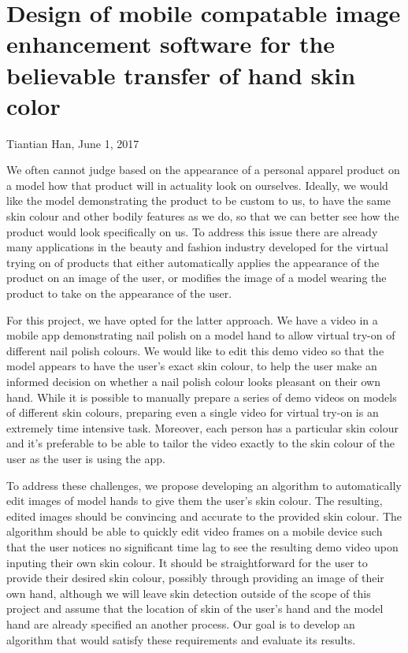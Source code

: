 \documentclass[12pt, a4paper]{article}
\begin{document}
\section*{Design of mobile compatable image enhancement software for the believable transfer of hand skin color}
Tiantian Han, June 1, 2017

We often cannot judge based on the appearance of a personal apparel product on a model how that product will in actuality look on ourselves. Ideally, we would like the model demonstrating the product to be custom to us, to have the same skin colour and other bodily features as we do, so that we can better see how the product would look specifically on us. To address this issue there are already many applications in the beauty and fashion industry developed for the virtual trying on of products that either automatically applies the appearance of the product on an image of the user, or modifies the image of a model wearing the product to take on the appearance of the user.

For this project, we have opted for the latter approach. We have a video in a mobile app demonstrating nail polish on a model hand to allow virtual try-on of different nail polish colours. We would like to edit this demo video so that the model appears to have the user's exact skin colour, to help the user make an informed decision on whether a nail polish colour looks pleasant on their own hand. While it is possible to manually prepare a series of demo videos on models of different skin colours, preparing even a single video for virtual try-on is an extremely time intensive task. Moreover, each person has a particular skin colour and it's preferable to be able to tailor the video exactly to the skin colour of the user as the user is using the app.

To address these challenges, we propose developing an algorithm to automatically edit images of model hands to give them the user's skin colour. The resulting, edited images should be convincing and accurate to the provided skin colour. The algorithm should be able to quickly edit video frames on a mobile device such that the user notices no significant time lag to see the resulting demo video upon inputing their own skin colour. It should be straightforward for the user to provide their desired skin colour, possibly through providing an image of their own hand, although we will leave skin detection outside of the scope of this project and assume that the location of skin of the user's hand and the model hand are already specified an another process. Our goal is to develop an algorithm that would satisfy these requirements and evaluate its results.
\end{document}
